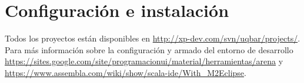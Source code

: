 \section{Configuración e instalación}
\label{Configuracion}
Todos los proyectos están disponibles en \url{http://xp-dev.com/svn/uqbar/projects/}.
Para más información sobre la configuración y armado del entorno de desarrollo
\url{https://sites.google.com/site/programacionui/material/herramientas/arena} y 
\url{https://www.assembla.com/wiki/show/scala-ide/With_M2Eclipse}. 





